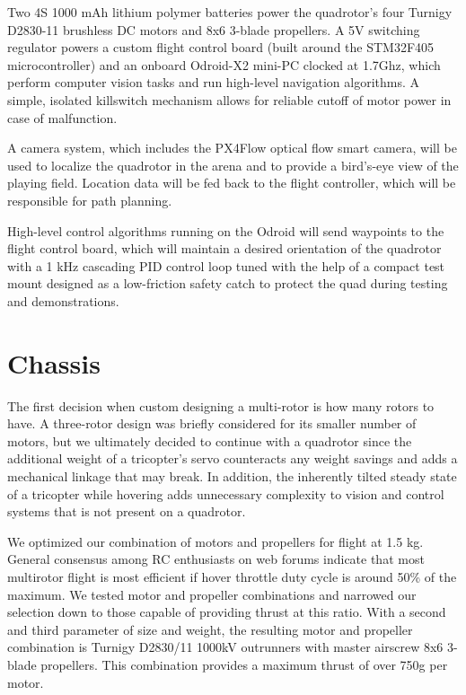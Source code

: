 \documentclass[12pt,letterpaper]{article} \usepackage[margin=1in]{geometry}
\begin{document}
Two 4S 1000 mAh lithium polymer batteries power the quadrotor's four Turnigy
D2830-11 brushless DC motors and 8x6 3-blade propellers. A 5V switching
regulator powers a custom flight control board (built around the STM32F405
microcontroller) and an onboard Odroid-X2 mini-PC clocked at 1.7Ghz, which
perform computer vision tasks and run high-level navigation algorithms.
A simple, isolated killswitch mechanism allows for reliable cutoff of motor
power in case of malfunction.

A camera system, which includes the PX4Flow optical flow smart camera, will be
used to localize the quadrotor in the arena and to provide a bird's-eye view of
the playing field. Location data will be fed back to the flight controller,
which will be responsible for path planning.

High-level control algorithms running on the Odroid will send waypoints to the
flight control board, which will maintain a desired orientation of the quadrotor
with a 1 kHz cascading PID control loop tuned with the help of a compact test
mount designed as a low-friction safety catch to protect the quad during testing
and demonstrations.


\section*{Chassis}

The first decision when custom designing a multi-rotor is how many rotors to
have. A three-rotor design was briefly considered for its smaller number of
motors, but we ultimately decided to continue with a quadrotor since the
additional weight of a tricopter's servo counteracts any weight savings and
adds a mechanical linkage that may break. In addition, the inherently tilted
steady state of a tricopter while hovering adds unnecessary complexity to
vision and control systems that is not present on a quadrotor.

We optimized our combination of motors and propellers for flight at 1.5 kg.
General consensus among RC enthusiasts on web forums indicate that most
multirotor flight is most efficient if hover throttle duty cycle is around 50\%
of the maximum. We tested motor and propeller combinations and narrowed our
selection down to those capable of providing thrust at this ratio. With
a second and third parameter of size and weight, the resulting motor and
propeller combination is Turnigy D2830/11 1000kV outrunners with master
airscrew 8x6 3-blade propellers. This combination provides a maximum thrust of
over 750g per motor.
\end{document}
